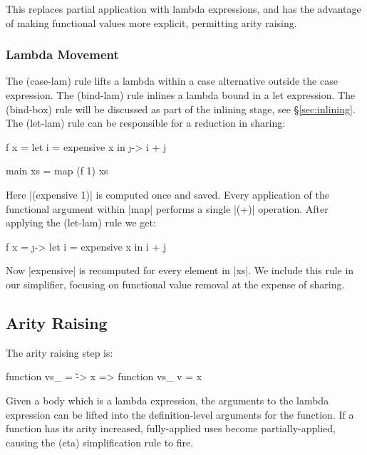 This replaces partial application with lambda expressions, and has the advantage of making functional values more explicit, permitting arity raising.

\subsubsection{Lambda Movement}
\label{sec:sharing}

The (case-lam) rule lifts a lambda within a case alternative outside the case expression. The (bind-lam) rule inlines a lambda bound in a let expression. The (bind-box) rule will be discussed as part of the inlining stage, see \S\ref{sec:inlining}. The (let-lam) rule can be responsible for a reduction in sharing:

\begin{example}
\begin{code}
f x =  let  i = expensive x
       in   \j -> i + j

main xs = map (f 1) xs
\end{code}

Here |(expensive 1)| is computed once and saved. Every application of the functional argument within |map| performs a single |(+)| operation. After applying the (let-lam) rule we get:

\begin{code}
f x =  \j ->  let  i = expensive x
              in   i + j
\end{code}

Now |expensive| is recomputed for every element in |xs|. We include this rule in our simplifier, focusing on functional value removal at the expense of sharing.
\end{example}


\subsection{Arity Raising}

\begin{definition}
The arity raising step is:

\ignore\begin{code}
function vs_ = \v -> x
    => function vs_ v = x
\end{code}
\end{definition}

Given a body which is a lambda expression, the arguments to the lambda expression can be lifted into the definition-level arguments for the function. If a function has its arity increased, fully-applied uses become partially-applied, causing the (eta) simplification rule to fire.



